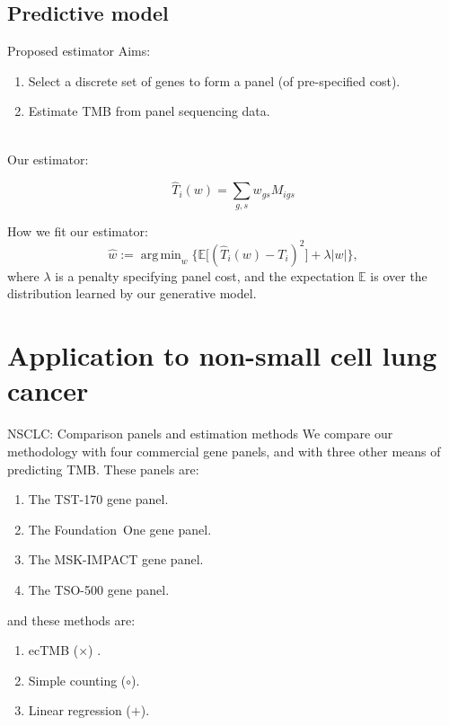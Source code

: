 \documentclass{beamer}
\DeclareMathOperator*{\argmin}{arg\,min}
\begin{document}
\subsection{Predictive model}
\begin{frame}{Proposed estimator}
Aims: 

\begin{enumerate}[1]
\item Select a discrete set of genes to form a panel (of pre-specified cost). 
\item Estimate TMB from panel sequencing data.
\end{enumerate} 
~\\
Our estimator:

\begin{equation}
    \hat{T}_i(w) = \sum_{g,s} w_{gs} M_{igs}
\end{equation}

How we fit our estimator:
\begin{equation}
    \hat{w} := \argmin_w \bigg\{ \mathbb{E}\big[(\hat{T}_i(w) - T_i)^2\big] + \lambda |w| \bigg\} ,
\end{equation}
where $\lambda$ is a penalty specifying panel cost, and the expectation $\mathbb{E}$ is over the distribution learned by our generative model.
\end{frame}



\section{Application to non-small cell lung cancer}

\begin{frame}{NSCLC: Comparison panels and estimation methods}
We compare our methodology with four commercial gene panels, and with three other means of predicting TMB. These panels are:
\begin{enumerate}
\item The \color{red} TST-170 \color{black} gene panel.
\item The \color{green} Foundation~One \color{black} gene panel.
\item The \color{blue} MSK-IMPACT \color{black} gene panel.
\item The \color{purple} TSO-500 \color{black} gene panel.
\end{enumerate}
and these methods are:
\begin{enumerate}
    \item ecTMB  ($\times$) \citep{yao_ectmb_2020}.
    \item Simple counting ($\circ$).
    \item Linear regression ($+$).
\end{enumerate}

\end{frame}
\end{document}
